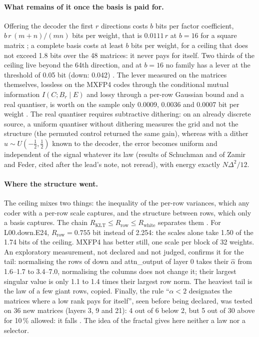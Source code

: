 \paragraph{What remains of it once the basis is paid for.} Offering the decoder the first $r$ directions costs $b$ bits per factor coefficient, $b\,r\,(m + n)/(mn)$ bits per weight, that is $0.0111\,r$ at $b = 16$ for a square matrix \calc; a complete basis costs at least $b$ bits per weight, for a ceiling that does not exceed 1.8 bits over the 48 matrices: it never pays for itself. Two thirds of the ceiling live beyond the 64th direction, and at $b = 16$ no family has a lever at the threshold of 0.05 bit (down: 0.042) . The lever measured on the matrices themselves, lossless on the MXFP4 codes through the conditional mutual information $I(C ; B_r \mid E)$ and lossy through a per-row Gaussian bound and a real quantiser, is worth on the sample only 0.0009, 0.0036 and 0.0007 bit per weight . The real quantiser requires subtractive dithering: on an already discrete source, a uniform quantiser without dithering measures the grid and not the structure (the permuted control returned the same gain), whereas with a dither $u \sim U(-\tfrac12, \tfrac12)$ known to the decoder, the error becomes uniform and independent of the signal whatever its law (results of Schuchman and of Zamir and Feder, cited after the lead's note, not reread), with energy exactly $N\Delta^2/12$.

\paragraph{Where the structure went.} The ceiling mixes two things: the inequality of the per-row variances, which any coder with a per-row scale captures, and the structure between rows, which only a basis captures. The chain $R_{\mathrm{KLT}} \le R_{\text{row}} \le R_{\text{white}}$ separates them \calc. For L00.down.E24, $R_{\text{row}} = 0.755$ bit instead of 2.254: the scales alone take 1.50 of the 1.74 bits of the ceiling. MXFP4 has better still, one scale per block of 32 weights. An exploratory measurement, not declared and not judged, confirms it for the tail: normalising the rows of down and attn\_output of layer 0 takes their $\hat\alpha$ from 1.6--1.7 to 3.4--7.0, normalising the columns does not change it; their largest singular value is only 1.1 to 1.4 times their largest row norm. The heaviest tail is the law of a few giant rows, copied. Finally, the rule ``$\hat\alpha < 2$ designates the matrices where a low rank pays for itself'', seen before being declared, was tested on 36 new matrices (layers 3, 9 and 21): 4 out of 6 below 2, but 5 out of 30 above for 10\,\% allowed: it falls . The idea of the fractal gives here neither a law nor a selector.

